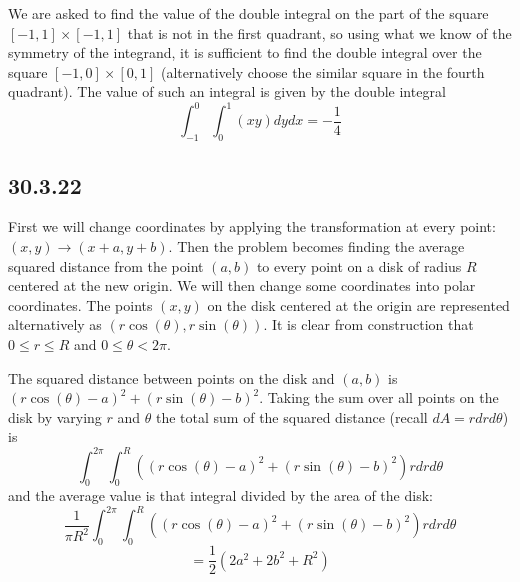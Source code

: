 \documentclass{article}
\begin{document}
We are asked to find the value of the double integral on the part of the square $[-1,1]\times[-1,1]$ that is not in the first quadrant, so using what we know of the symmetry of the integrand, it is sufficient to find the double integral over the square $[-1,0]\times[0,1]$ (alternatively choose the similar square in the fourth quadrant). The value of such an integral is given by the double integral $$\int_{-1}^0\int_0^1(xy)dydx = -\frac{1}{4}$$

\subsection{30.3.22}

First we will change coordinates by applying the transformation at every point: $(x,y) \to (x+a, y+b)$. Then the problem becomes finding the average squared distance from the point $(a,b)$ to every point on a disk of radius $R$ centered at the new origin. We will then change some coordinates into polar coordinates. The points $(x,y)$ on the disk centered at the origin are represented alternatively as $(r\cos(\theta), r\sin(\theta))$. It is clear from construction that $ 0\leq r\leq R$ and $0\leq \theta < 2\pi $.

The squared distance between points on the disk and $(a,b)$ is $(r\cos(\theta)-a)^2+(r\sin(\theta)-b)^2$. Taking the sum over all points on the disk by varying $r$ and $\theta$ the total sum of the squared distance (recall $dA = r drd\theta$) is $$\int_0^{2\pi}\int_0^R\left((r\cos(\theta)-a)^2+(r\sin(\theta)-b)^2\right) r drd\theta$$ and the average value is that integral divided by the area of the disk:
$$\frac{1}{\pi R^2}\int_0^{2\pi}\int_0^R\left((r\cos(\theta)-a)^2+(r\sin(\theta)-b)^2\right) r drd\theta$$
$$=\frac{1}{2} (2 a^2 + 2 b^2 + R^2)$$
\end{document}
